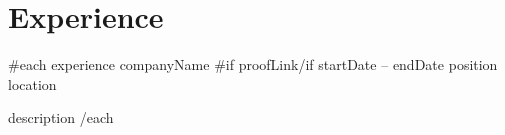 \section{Experience}
\vspace{0pt}
\resumeSubHeadingListStart

{{#each experience}}
\resumeSubheading
  { {{companyName}} {{#if proofLink}}\href{ {{proofLink}} }{\faLink}{{/if}} }{ {{startDate}} -- {{endDate}} }
  { {{position}} }{ {{location}} }
  \resumeItemListStart
    \item {{description}}
  \resumeItemListEnd
{{/each}}

\resumeSubHeadingListEnd
\vspace{-5.5mm}
